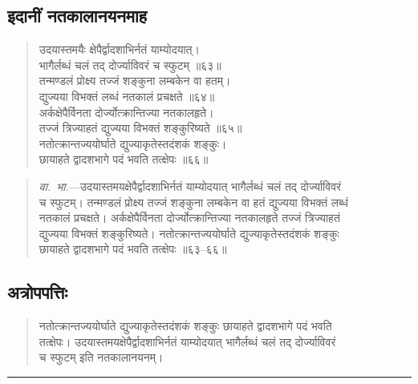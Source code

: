 \documentclass[11pt,a4paper]{article}
\newcommand{\longline}{\noindent\rule{\textwidth}{0.4pt}}
\newcommand{\dev}[1]{{\devanagarifont #1}}
\newenvironment{shloka}{%
  \begin{quote}
  \small
  \setlength{\leftmargin}{2em}
  \devanagarifont
}{\end{quote}}
\newenvironment{vyakhya}{%
  \begin{quote}
  \small
  \setlength{\leftmargin}{1em}
  \devanagarifont
}{\end{quote}}
\newcommand{\skt}[1]{{\devanagarifont #1}}
\begin{document}
\subsection{\dev{इदानीं नतकालानयनमाह}}

\begin{shloka}
\skt{उदयास्तमयैः क्षेपैर्द्वादशाभिर्नतं याम्योदयात्।}\\
\skt{भागैर्लब्धं चलं तद् दोर्ज्याविवरं च स्फुटम् ॥६३॥}\\[0.3em]
\skt{तन्मण्डलं प्रोक्ष्य तज्जं शङ्कुना लम्बकेन वा हतम्।}\\
\skt{द्युज्यया विभक्तं लब्धं नतकालं प्रचक्षते ॥६४॥}\\[0.3em]
\skt{अर्कक्षेपैर्विनता दोर्ज्योत्क्रान्तिज्या नतकालहृते।}\\
\skt{तज्जं त्रिज्याहतं द्युज्यया विभक्तं शङ्कुरिष्यते ॥६५॥}\\[0.3em]
\skt{नतोत्क्रान्तज्ययोर्घाते द्युज्याकृतेस्तदंशकं शङ्कुः।}\\
\skt{छायाहते द्वादशभागे पदं भवति तत्क्षेपः ॥६६॥}
\end{shloka}

\begin{vyakhya}
\textit{वा.\ भा.}—\skt{उदयास्तमयक्षेपैर्द्वादशाभिर्नतं याम्योदयात् भागैर्लब्धं चलं तद् दोर्ज्याविवरं}\\
\skt{च स्फुटम्। तन्मण्डलं प्रोक्ष्य तज्जं शङ्कुना लम्बकेन वा हतं द्युज्यया विभक्तं लब्धं}\\
\skt{नतकालं प्रचक्षते। अर्कक्षेपैर्विनता दोर्ज्योत्क्रान्तिज्या नतकालहृते तज्जं त्रिज्याहतं}\\
\skt{द्युज्यया विभक्तं शङ्कुरिष्यते। नतोत्क्रान्तज्ययोर्घाते द्युज्याकृतेस्तदंशकं शङ्कुः}\\
\skt{छायाहते द्वादशभागे पदं भवति तत्क्षेपः ॥६३--६६॥}
\end{vyakhya}

\subsection{\dev{अत्रोपपत्तिः}}

\begin{vyakhya}
\skt{नतोत्क्रान्तज्ययोर्घाते द्युज्याकृतेस्तदंशकं शङ्कुः छायाहते द्वादशभागे पदं भवति}\\
\skt{तत्क्षेपः। उदयास्तमयक्षेपैर्द्वादशाभिर्नतं याम्योदयात् भागैर्लब्धं चलं तद् दोर्ज्याविवरं}\\
\skt{च स्फुटम् इति नतकालानयनम्।}
\end{vyakhya}

\longline
\end{document}
